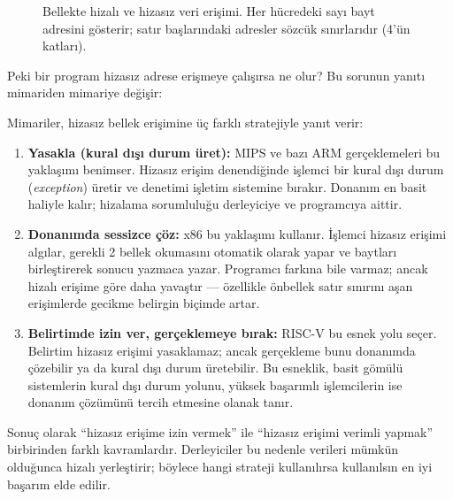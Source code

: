\begin{figure}[H]
\caption[Bellekte hizalı ve hizasız veri erişimi]{Bellekte hizalı ve hizasız veri erişimi. Her hücredeki sayı bayt adresini gösterir; satır başlarındaki adresler sözcük sınırlarıdır (4'ün katları).}
\label{fig:bellek-hizali}
\end{figure}

Peki bir program hizasız adrese erişmeye çalışırsa ne olur? Bu sorunun yanıtı mimariden mimariye değişir:

\begin{karsilastirma}
Mimariler, hizasız bellek erişimine üç farklı stratejiyle yanıt verir:

\begin{enumerate}[nosep]
\item \textbf{Yasakla (kural dışı durum üret):} MIPS ve bazı ARM gerçeklemeleri bu yaklaşımı benimser. Hizasız erişim denendiğinde işlemci bir kural dışı durum (\emph{exception}) üretir ve denetimi işletim sistemine bırakır. Donanım en basit haliyle kalır; hizalama sorumluluğu derleyiciye ve programcıya aittir.

\item \textbf{Donanımda sessizce çöz:} x86 bu yaklaşımı kullanır. İşlemci hizasız erişimi algılar, gerekli 2 bellek okumasını otomatik olarak yapar ve baytları birleştirerek sonucu yazmaca yazar. Programcı farkına bile varmaz; ancak hizalı erişime göre daha yavaştır --- özellikle önbellek satır sınırını aşan erişimlerde gecikme belirgin biçimde artar.

\item \textbf{Belirtimde izin ver, gerçeklemeye bırak:} RISC-V bu esnek yolu seçer. Belirtim hizasız erişimi yasaklamaz; ancak gerçekleme bunu donanımda çözebilir ya da kural dışı durum üretebilir. Bu esneklik, basit gömülü sistemlerin kural dışı durum yolunu, yüksek başarımlı işlemcilerin ise donanım çözümünü tercih etmesine olanak tanır.
\end{enumerate}

Sonuç olarak ``hizasız erişime izin vermek'' ile ``hizasız erişimi verimli yapmak'' birbirinden farklı kavramlardır. Derleyiciler bu nedenle verileri mümkün olduğunca hizalı yerleştirir; böylece hangi strateji kullanılırsa kullanılsın en iyi başarım elde edilir.
\end{karsilastirma}

